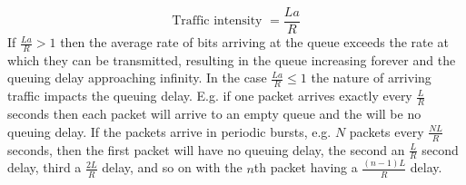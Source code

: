 \[
	\text{Traffic intensity }=\frac{La}{R}
\]
If $\frac{La}{R}>1$ then the average rate of bits arriving at the queue exceeds the rate at which they can be transmitted, resulting in the queue increasing forever and the queuing delay approaching infinity.
In the case $\frac{La}{R}\leq1$ the nature of arriving traffic impacts the queuing delay. E.g. if one packet arrives exactly every $\frac{L}{R}$ seconds then each packet will arrive to an empty queue and the will be no queuing delay. If the packets arrive in periodic bursts, e.g. $N$ packets every $\frac{NL}{R}$ seconds, then the first packet will have no queuing delay, the second an $\frac{L}{R}$ second delay, third a $\frac{2L}{R}$ delay, and so on with the $n$th packet having a $\frac{(n-1)L}{R}$ delay.
